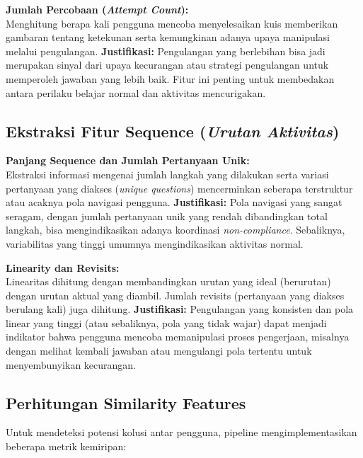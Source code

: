 \textbf{Jumlah Percobaan (\textit{Attempt Count}):} \\
Menghitung berapa kali pengguna mencoba menyelesaikan kuis memberikan gambaran tentang ketekunan serta kemungkinan adanya upaya manipulasi melalui pengulangan.
\textbf{Justifikasi:} Pengulangan yang berlebihan bisa jadi merupakan sinyal dari upaya kecurangan atau strategi pengulangan untuk memperoleh jawaban yang lebih baik. Fitur ini penting untuk membedakan antara perilaku belajar normal dan aktivitas mencurigakan.

\subsection{Ekstraksi Fitur Sequence (\textit{Urutan Aktivitas})}
\label{sec:ekstraksiFiturSequence}
\textbf{Panjang Sequence dan Jumlah Pertanyaan Unik:} \\
Ekstraksi informasi mengenai jumlah langkah yang dilakukan serta variasi pertanyaan yang diakses (\textit{unique questions}) mencerminkan seberapa terstruktur atau acaknya pola navigasi pengguna.
\textbf{Justifikasi:} Pola navigasi yang sangat seragam, dengan jumlah pertanyaan unik yang rendah dibandingkan total langkah, bisa mengindikasikan adanya koordinasi \textit{non-compliance}. Sebaliknya, variabilitas yang tinggi umumnya mengindikasikan aktivitas normal.

\textbf{Linearity dan Revisits:} \\
Linearitas dihitung dengan membandingkan urutan yang ideal (berurutan) dengan urutan aktual yang diambil. Jumlah revisits (pertanyaan yang diakses berulang kali) juga dihitung.
\textbf{Justifikasi:} Pengulangan yang konsisten dan pola linear yang tinggi (atau sebaliknya, pola yang tidak wajar) dapat menjadi indikator bahwa pengguna mencoba memanipulasi proses pengerjaan, misalnya dengan melihat kembali jawaban atau mengulangi pola tertentu untuk menyembunyikan kecurangan.

\subsection{Perhitungan Similarity Features}
\label{sec:perhitunganSimilarityFeatures}
Untuk mendeteksi potensi kolusi antar pengguna, pipeline mengimplementasikan beberapa metrik kemiripan:

